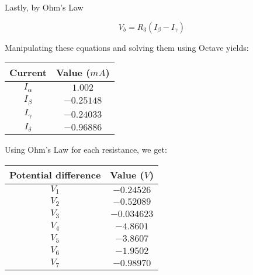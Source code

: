 Lastly, by Ohm's Law

\begin{equation}
  V_b = R_3 (I_\beta - I_\gamma)
\end{equation}

Manipulating these equations and solving them using Octave yields:



\begin{table}[H]
  \centering
  \begin{tabular}{|c|c|}
    \hline
    Current & Value ($mA$) \\
    \hline
    \hline
    $I_\alpha$ & $1.002$ \\
    \hline
    $I_\beta$ & $-0.25148$ \\
    \hline
    $I_\gamma$ & $-0.24033$ \\
    \hline
    $I_\delta$ & $-0.96886$ \\
    \hline
   \end{tabular}
\end{table}

Using Ohm's Law for each resistance, we get:

\begin{table}[H]
  \centering
  \begin{tabular}{|c|c|}
    \hline
    Potential difference & Value ($V$) \\
    \hline
    \hline
    $V_1$ & $-0.24526$ \\
    \hline
    $V_2$ & $-0.52089$ \\
    \hline
    $V_3$ & $-0.034623$ \\
    \hline
    $V_4$ & $-4.8601$ \\
    \hline
    $V_5$ & $-3.8607$ \\
    \hline
    $V_6$ & $-1.9502$ \\
    \hline
    $V_7$ & $-0.98970$ \\
    \hline
  \end{tabular}
\end{table}

